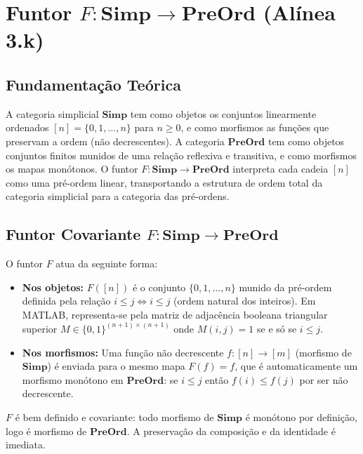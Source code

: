 \section{Funtor $F: \mathbf{Simp} \to \mathbf{PreOrd}$ (Alínea 3.k)}
\label{sec:functor-simp-preord}

\subsection{Fundamentação Teórica}

A categoria simplicial $\mathbf{Simp}$ tem como objetos os conjuntos linearmente ordenados $[n] = \{0, 1, \ldots, n\}$ para $n \geq 0$, e como morfismos as funções que preservam a ordem (não decrescentes). A categoria $\mathbf{PreOrd}$ tem como objetos conjuntos finitos munidos de uma relação reflexiva e transitiva, e como morfismos os mapas monótonos. O funtor $F: \mathbf{Simp} \to \mathbf{PreOrd}$ interpreta cada cadeia $[n]$ como uma pré-ordem linear, transportando a estrutura de ordem total da categoria simplicial para a categoria das pré-ordens.

\subsection{Funtor Covariante $F: \mathbf{Simp} \to \mathbf{PreOrd}$}

\begin{definition}
O funtor $F$ atua da seguinte forma:
\begin{itemize}
    \item \textbf{Nos objetos:} $F([n])$ é o conjunto $\{0, 1, \ldots, n\}$ munido da pré-ordem definida pela relação $i \leq j \iff i \leq j$ (ordem natural dos inteiros). Em MATLAB, representa-se pela matriz de adjacência booleana triangular superior $M \in \{0,1\}^{(n+1) \times (n+1)}$ onde $M(i,j) = 1$ se e só se $i \leq j$.
    \item \textbf{Nos morfismos:} Uma função não decrescente $f: [n] \to [m]$ (morfismo de $\mathbf{Simp}$) é enviada para o mesmo mapa $F(f) = f$, que é automaticamente um morfismo monótono em $\mathbf{PreOrd}$: se $i \leq j$ então $f(i) \leq f(j)$ por ser não decrescente.
\end{itemize}
\end{definition}

\begin{proposition}
$F$ é bem definido e covariante: todo morfismo de $\mathbf{Simp}$ é monótono por definição, logo é morfismo de $\mathbf{PreOrd}$. A preservação da composição e da identidade é imediata.
\end{proposition}


